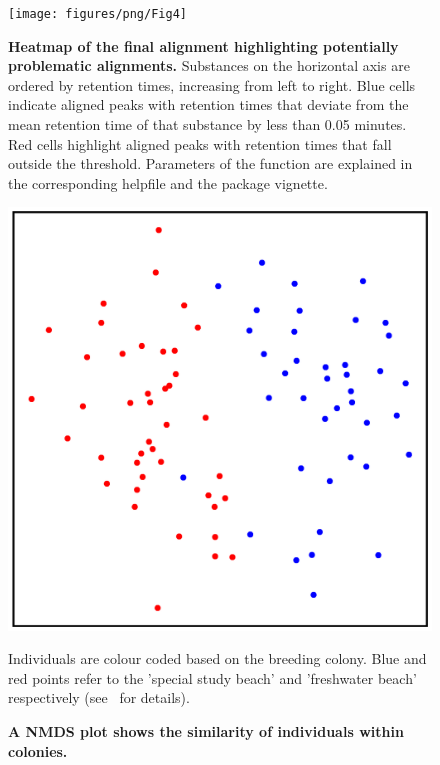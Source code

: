 \documentclass[10pt,letterpaper]{article}
\begin{document}
\newpage
\begin{figure}[htbp]
\centering
\texttt{[image: figures/png/Fig4]}
\caption{\textbf{Heatmap of the final alignment highlighting potentially problematic alignments.} 
Substances on the horizontal axis are ordered by retention times, increasing from left to right. Blue cells indicate aligned peaks with retention times that deviate from the mean retention time of that substance by less than 0.05 minutes.  Red cells highlight aligned peaks with retention times that fall outside the threshold. Parameters of the function are explained in the corresponding helpfile and the package vignette.}
\label{Fig:Fig4}
\end{figure} 

\newpage
\begin{figure}[htbp]
\centering
\includegraphics[width = 14cm]{figures/png/Fig5}
\caption{\textbf{A NMDS plot shows the similarity of individuals within colonies.}}
Individuals are colour coded based on the breeding colony. Blue and red points refer to the 'special study beach' and 'freshwater beach' respectively (see~\cite{Stoffel.2015} for details).
\label{Fig:Fig5}
\end{figure} 
\end{document}
